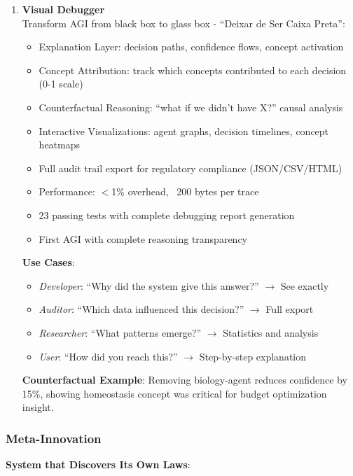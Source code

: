 \documentclass[11pt]{article}
\begin{document}
\begin{enumerate}
    \item \textbf{Visual Debugger} \\
    Transform AGI from black box to glass box - ``Deixar de Ser Caixa Preta'':
    \begin{itemize}
        \item Explanation Layer: decision paths, confidence flows, concept activation
        \item Concept Attribution: track which concepts contributed to each decision (0-1 scale)
        \item Counterfactual Reasoning: ``what if we didn't have X?'' causal analysis
        \item Interactive Visualizations: agent graphs, decision timelines, concept heatmaps
        \item Full audit trail export for regulatory compliance (JSON/CSV/HTML)
        \item Performance: $<$1\% overhead, ~200 bytes per trace
        \item 23 passing tests with complete debugging report generation
        \item First AGI with complete reasoning transparency
    \end{itemize}

\textbf{Use Cases}:
\begin{itemize}
    \item \textit{Developer}: ``Why did the system give this answer?'' $\rightarrow$ See exactly
    \item \textit{Auditor}: ``Which data influenced this decision?'' $\rightarrow$ Full export
    \item \textit{Researcher}: ``What patterns emerge?'' $\rightarrow$ Statistics and analysis
    \item \textit{User}: ``How did you reach this?'' $\rightarrow$ Step-by-step explanation
\end{itemize}

\textbf{Counterfactual Example}: Removing biology-agent reduces confidence by 15\%, showing homeostasis concept was critical for budget optimization insight.
\end{enumerate}

\subsubsection{Meta-Innovation}

\textbf{System that Discovers Its Own Laws}:
\end{document}

